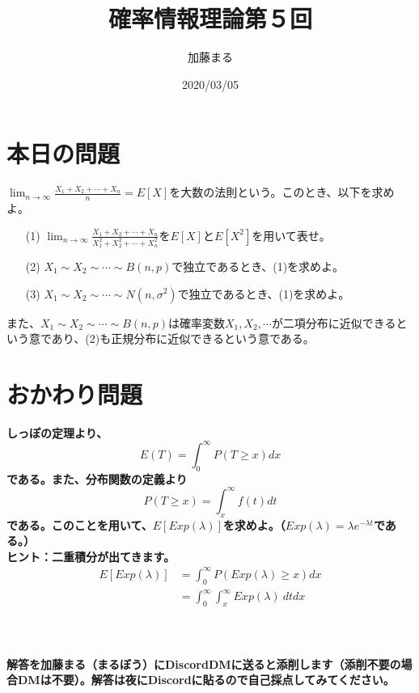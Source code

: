 \documentclass[a4j,uplatex]{jsarticle}
\title{確率情報理論第５回}
\author{加藤まる}
\date{2020/03/05}
\begin{document}
\maketitle

\section*{本日の問題}
$\displaystyle \lim_{n \to \infty} \frac{X_1 + X_2 + \cdots +X_n}{n}=E[X]$を大数の法則という。このとき、以下を求めよ。
\begin{itemize}
  \item[(1)] $\displaystyle \lim_{n \to \infty} \frac{X_1 + X_2 + \cdots +X_n}{X_1^2 + X_2^2 + \cdots +X_n^2}$を$E[X]$と$E[X^2]$を用いて表せ。
  \item[(2)] $X_1\sim X_2\sim \cdots \sim B(n,p)$で独立であるとき、(1)を求めよ。
  \item[(3)] $X_1\sim X_2\sim \cdots \sim N(n,\sigma ^2)$で独立であるとき、(1)を求めよ。
\end{itemize}
また、$X_1\sim X_2\sim \cdots \sim B(n,p)$は確率変数$X_1, X_2,\cdots$が二項分布に近似できるという意であり、(2)も正規分布に近似できるという意である。


\section*{おかわり問題}
\bf しっぽの定理\rm より、
\begin{equation}
  E(T)=\int_{0}^{\infty} P(T\ge x)dx
\end{equation}
である。また、分布関数の定義より
\begin{equation}
  P(T\ge x) = \int_{x}^{\infty} f(t)dt
\end{equation}
である。このことを用いて、$E[Exp(\lambda)]$を求めよ。（$Exp(\lambda)=\lambda e^{-\lambda t}$である。）
\\
ヒント：二重積分が出てきます。
\begin{equation}
  \begin{split}
    E[Exp(\lambda)] &= \int_{0}^{\infty} P(Exp(\lambda)\ge x)dx \\
    &=\int_{0}^{\infty} \int_{x}^{\infty} Exp(\lambda)~ dt dx
  \end{split}
\end{equation}
\\
\\
\\
解答を加藤まる（まるぼう）にDiscordDMに送ると添削します（添削不要の場合DMは不要）。解答は夜にDiscordに貼るので自己採点してみてください。
\end{document}

